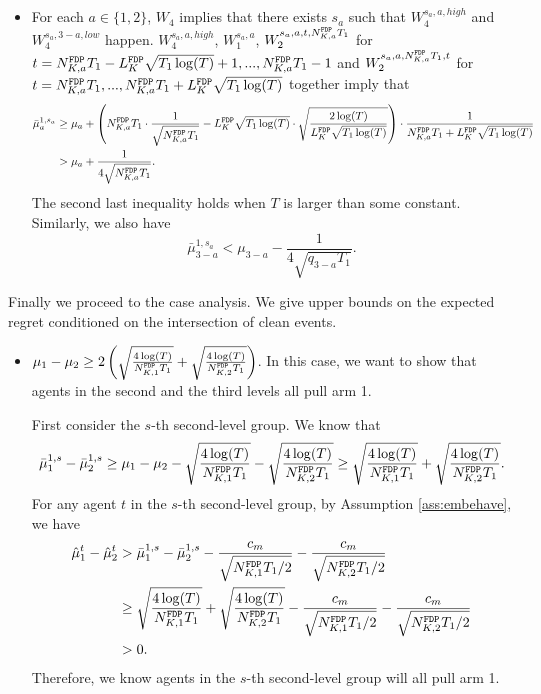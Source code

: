 {\begin{itemize}
If there are at least $T_2$ pulls of arm $a$ in the first two levels,
\[
|\bar{\mu}_a-\mu_a| \leq \sqrt{\frac{2\log(T)}{T_2}}.
\]

\item For each $a \in \{1,2\}$, $W_4$ implies that there exists $s_a$ such that $W_4^{s_a,a,high}$ and $W_4^{s_a,3-a,low}$ happen. $W_4^{s_a,a,high}$,  $W_1^{s_a,a}$, $W_2^{s_a,a,t, \fdpN T_1}$ for $t = \fdpN  T_1- \GdT \sqrt{T_1\log(T)}+1, ...,\fdpN T_1-1$ and $W_2^{s_a,a,\fdpN T_1,t}$ for $t= \fdpN T_1,...,\fdpN  T_1+ \GdT \sqrt{T_1\log(T)}$ together imply that
\begin{align*}
\bar{\mu}_a ^{1,s_a} &\geq \mu_a + \left(\fdpN T_1 \cdot \frac{1}{\sqrt{\fdpN T_1}} - \GdT \sqrt{T_1\log(T)} \cdot \sqrt{\frac{2\log(T)}{ \GdT \sqrt{T_1\log(T)}}} \right) \cdot \frac{1}{\fdpN  T_1+ \GdT \sqrt{T_1\log(T)}} \\
&> \mu_a + \frac{1}{4\sqrt{\fdpN T_1}}.
\end{align*}
The second last inequality holds when $T$ is larger than some constant.
Similarly, we also have
\[
\bar{\mu}_{3-a} ^{1,s_a} < \mu_{3-a}   - \frac{1}{4\sqrt{q_{3-a} T_1}}.
\]
\end{itemize}

Finally we proceed to the case analysis. We give upper bounds on the expected regret conditioned on the intersection of clean events.

\begin{itemize}

\item $\mu_1 - \mu_2 \geq 2\left(\sqrt{\frac{4\log(T)}{\fdpN[1]T_1}}
+ \sqrt{\frac{4\log(T)}{\fdpN[2]T_1}}\right)$. In this case, we want to show that agents in the second and the third levels all pull arm 1.

First consider the $s$-th second-level group. We know that
\[
\bar{\mu}_1^{1,s} - \bar{\mu}_2^{1,s} \geq \mu_1 -\mu_2 - \sqrt{\frac{4\log(T)}{\fdpN[1]T_1}} - \sqrt{\frac{4\log(T)}{\fdpN[2]T_1}} \geq  \sqrt{\frac{4\log(T)}{\fdpN[1]T_1}} + \sqrt{\frac{4\log(T)}{\fdpN[2]T_1}}.
\]
For any agent $t$ in the $s$-th second-level group, by Assumption \ref{ass:embehave}, we have
\begin{align*}
\hat{\mu}_1^t - \hat{\mu}_2^t &>\bar{\mu}_1^{1,s} - \bar{\mu}_2^{1,s} - \frac{c_m}{\sqrt{\fdpN[1]T_1/2}} - \frac{c_m}{\sqrt{\fdpN[2]T_1/2}}\\
&\geq  \sqrt{\frac{4\log(T)}{\fdpN[1]T_1}} + \sqrt{\frac{4\log(T)}{\fdpN[2]T_1}}- \frac{c_m}{\sqrt{\fdpN[1]T_1/2}} - \frac{c_m}{\sqrt{\fdpN[2]T_1/2}}\\
 &> 0.
\end{align*}
Therefore, we know agents in the $s$-th second-level group will all pull arm 1.


\end{itemize}}
